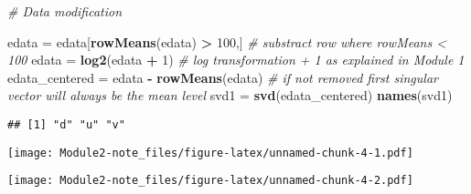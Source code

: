 \documentclass[]{article}
\newenvironment{Shaded}{\begin{snugshade}}{\end{snugshade}}
\newcommand{\KeywordTok}[1]{\textcolor[rgb]{0.13,0.29,0.53}{\textbf{#1}}}
\newcommand{\DataTypeTok}[1]{\textcolor[rgb]{0.13,0.29,0.53}{#1}}
\newcommand{\DecValTok}[1]{\textcolor[rgb]{0.00,0.00,0.81}{#1}}
\newcommand{\StringTok}[1]{\textcolor[rgb]{0.31,0.60,0.02}{#1}}
\newcommand{\CommentTok}[1]{\textcolor[rgb]{0.56,0.35,0.01}{\textit{#1}}}
\newcommand{\OperatorTok}[1]{\textcolor[rgb]{0.81,0.36,0.00}{\textbf{#1}}}
\newcommand{\NormalTok}[1]{#1}
\begin{document}
\begin{Shaded}
\begin{Highlighting}[]
\CommentTok{# Data modification}

\NormalTok{edata =}\StringTok{ }\NormalTok{edata[}\KeywordTok{rowMeans}\NormalTok{(edata) }\OperatorTok{>}\StringTok{ }\DecValTok{100}\NormalTok{,] }\CommentTok{# substract row where rowMeans < 100}
\NormalTok{edata =}\StringTok{ }\KeywordTok{log2}\NormalTok{(edata }\OperatorTok{+}\StringTok{ }\DecValTok{1}\NormalTok{) }\CommentTok{# log transformation + 1 as explained in Module 1}
\NormalTok{edata_centered =}\StringTok{ }\NormalTok{edata }\OperatorTok{-}\StringTok{ }\KeywordTok{rowMeans}\NormalTok{(edata) }\CommentTok{# if not removed first singular vector will always be the mean level}
\NormalTok{svd1 =}\StringTok{ }\KeywordTok{svd}\NormalTok{(edata_centered)}
\KeywordTok{names}\NormalTok{(svd1)}
\end{Highlighting}
\end{Shaded}

\begin{verbatim}
## [1] "d" "u" "v"
\end{verbatim}

\begin{Shaded}
\end{Shaded}

\texttt{[image: Module2-note\_files/figure-latex/unnamed-chunk-4-1.pdf]}

\begin{Shaded}
\end{Shaded}

\texttt{[image: Module2-note\_files/figure-latex/unnamed-chunk-4-2.pdf]}
\end{document}
